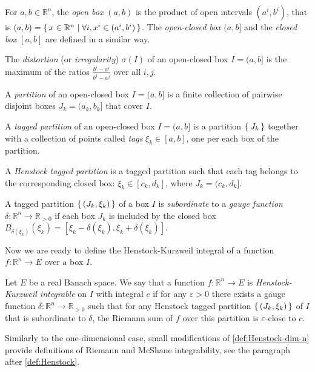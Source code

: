 \documentclass[a4paper, UKenglish,cleveref, autoref, thm-restate]{lipics-v2021}
\newcommand{\bbR}{\mathbb{R}}
\newcommand{\eps}{\varepsilon}
\begin{document}
\begin{definition}%
  \label{def:box-partition}
  For \(a, b \in \bbR^{n}\), the \emph{open box} \((a, b)\) is the
  product of open intervals \((a^{i}, b^{i})\), that is
  \((a, b)=\set{x\in\bbR^{n}|\forall i, x^{i}\in(a^{i}, b^{i})}\). The
  \emph{open-closed box} \((a, b]\) and the \emph{closed box}
  \([a, b]\) are defined in a similar way.

  The \emph{distortion} (or \emph{irregularity}) \(\sigma(I)\) of an
  open-closed box \(I=(a, b]\) is the maximum of the ratios
  \(\frac{b^{i}-a^{i}}{b^{j}-a^{j}}\) over all \(i, j\).

  A \emph{partition} of an open-closed box \(I=(a, b]\) is a finite
  collection of pairwise disjoint boxes \(J_{k}=(a_{k}, b_{k}]\) that
  cover \(I\).

  A \emph{tagged partition} of an open-closed box \(I=(a, b]\) is a partition
  \(\set{J_{k}}\) together with a collection of points called
  \emph{tags} \(\xi_{k}\in [a, b]\), one per each box of the partition.

  A \emph{Henstock tagged partition} is a tagged partition such that
  each tag belongs to the corresponding closed box:
  \(\xi_{k}\in [c_{k}, d_{k}]\), where \(J_{k}=(c_{k}, d_{k}]\).

  A tagged partition \(\set{(J_{k}, \xi_{k})}\) of a box \(I\) is
  \emph{subordinate} to a \emph{gauge function}
  \(\delta\colon \bbR^{n}\to\bbR_{>0}\) if each box \(J_{k}\) is
  included by the closed box
  \(B_{\delta(\xi_{k})}(\xi_{k})=[\xi_{k}-\delta(\xi_{k}),
  \xi_{k}+\delta(\xi_{k})]\).
\end{definition}

Now we are ready to define the Henstock-Kurzweil integral of a
function \(f\colon \bbR^{n}\to E\) over a box \(I\).
\begin{definition}%
  \label{def:Henstock-dim-n}
  Let \(E\) be a real Banach space. We say that a function
  \(f\colon \bbR^{n}\to E\) is \emph{Henstock-Kurzweil integrable} on
  \(I\) with integral \(c\) if for any \(\eps>0\) there exists a gauge
  function \(\delta\colon \bbR^{n}\to \bbR_{>0}\) such that for any
  Henstock tagged partition \(\set{(J_{k}, \xi_{k})}\) of \(I\) that
  is subordinate to \(\delta\), the Riemann sum of \(f\) over this
  partition is \(\eps\)-close to \(c\).
\end{definition}

Similarly to the one-dimensional case, small modifications of
\autoref{def:Henstock-dim-n} provide definitions of Riemann and
McShane integrability, see the paragraph after \autoref{def:Henstock}.
\end{document}
